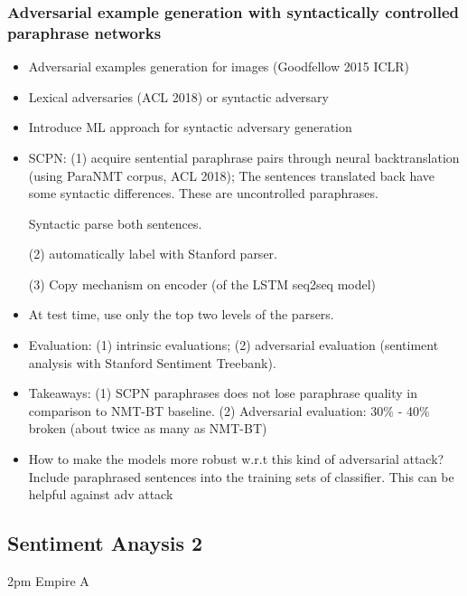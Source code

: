 \subsubsection{Adversarial example generation with syntactically controlled paraphrase networks \cite{Iyyer2018Adversarial}}
\begin{itemize}
	\item Adversarial examples generation for images (Goodfellow 2015 ICLR)
	\item Lexical adversaries (ACL 2018) or syntactic adversary
	\item Introduce ML approach for syntactic adversary generation
	\item SCPN: (1) acquire sentential paraphrase pairs through neural backtranslation (using ParaNMT corpus, ACL 2018); The sentences translated back have some syntactic differences. These are uncontrolled paraphrases.
	
	Syntactic parse both sentences. 
	
	(2) automatically label with Stanford parser.
	
	(3) Copy mechanism on encoder (of the LSTM seq2seq model)
	
	\item At test time, use only the top two levels of the parsers.
	
	\item Evaluation: (1) intrinsic evaluations; (2) adversarial evaluation (sentiment analysis with Stanford Sentiment Treebank).
	
	\item Takeaways: (1) SCPN paraphrases does not lose paraphrase quality in comparison to NMT-BT baseline. (2) Adversarial evaluation: 30\% - 40\% broken (about twice as many as NMT-BT)
	
	\item How to make the models more robust w.r.t this kind of adversarial attack? Include paraphrased sentences into the training sets of classifier. This can be helpful against adv attack 
	
\end{itemize}

\subsection{Sentiment Anaysis 2}
2pm Empire A

